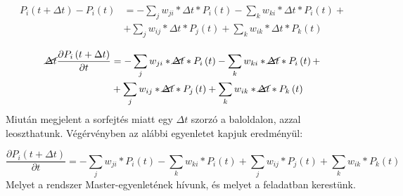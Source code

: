 \begin{align}
    P_{i} \left( t + \Delta t \right)
    -
    P_{i} \left( t \right)
    &=
    -
    \sum_{j} w_{ji} * \Delta t * P_{i} \left( t \right)
    -
    \sum_{k} w_{ki} * \Delta t * P_{i} \left( t \right) + \nonumber \\
    &+
    \sum_{j} w_{ij} * \Delta t * P_{j} \left( t \right)
    +
    \sum_{k} w_{ik} * \Delta t * P_{k} \left( t \right)
\end{align}

\begin{align}
    \cancel{\Delta t} \frac{\partial P_{i} \left( t + \Delta t \right)}{\partial t}
    &=
    -
    \sum_{j} w_{ji} * \cancel{\Delta t} * P_{i} \left( t \right)
    -
    \sum_{k} w_{ki} * \cancel{\Delta t} * P_{i} \left( t \right) + \nonumber \\
    &+
    \sum_{j} w_{ij} * \cancel{\Delta t} * P_{j} \left( t \right)
    +
    \sum_{k} w_{ik} * \cancel{\Delta t} * P_{k} \left( t \right)
\end{align}
Miután megjelent a sorfejtés miatt egy $\Delta t$ szorzó a baloldalon, azzal leoszthatunk. Végérvényben az alábbi egyenletet kapjuk eredményül:

\begin{equation}
    \boxed{
    \frac{\partial P_{i} \left( t + \Delta t \right)}{\partial t}
    =
    -
    \sum_{j} w_{ji} * P_{i} \left( t \right)
    -
    \sum_{k} w_{ki} * P_{i} \left( t \right)
    +
    \sum_{j} w_{ij} * P_{j} \left( t \right)
    +
    \sum_{k} w_{ik} * P_{k} \left( t \right)
    }
\end{equation}
Melyet a rendszer Master-egyenletének hívunk, és melyet a feladatban kerestünk.